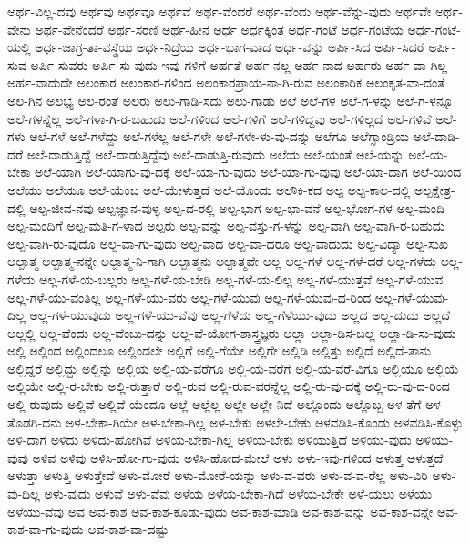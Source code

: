 {ಅರ್ಥ-ವಿಲ್ಲ-ದವು
ಅರ್ಥವು
ಅರ್ಥವೂ
ಅರ್ಥವೆ
ಅರ್ಥ-ವೆಂದರೆ
ಅರ್ಥ-ವೆಂದು
ಅರ್ಥ-ವೆನ್ನು-ವುದು
ಅರ್ಥವೇ
ಅರ್ಥ-ವೇನು
ಅರ್ಥ-ವೇನೆಂದರೆ
ಅರ್ಥ-ಸರಣಿ
ಅರ್ಥ-ಹೀನ
ಅರ್ಧ
ಅರ್ಧಕ್ಕಿಂತ
ಅರ್ಧ-ಗಂಟೆ
ಅರ್ಧ-ಗಂಟೆಯ
ಅರ್ಧ-ಗಂಟೆ-ಯಲ್ಲಿ
ಅರ್ಧ-ಜಾಗ್ರ-ತಾ-ವಸ್ಥೆಯ
ಅರ್ಧ-ನಿದ್ರೆಯ
ಅರ್ಧ-ಭಾಗ-ವಾದ
ಅರ್ಧ-ವನ್ನು
ಅರ್ಪಿ-ಸಿದ
ಅರ್ಪಿ-ಸಿದರೆ
ಅರ್ಪಿ-ಸುವ
ಅರ್ಪಿ-ಸುವರು
ಅರ್ಪಿ-ಸು-ವುದು-ಇವು-ಗಳಿಗೆ
ಅರ್ಹತೆ
ಅರ್ಹ-ನಲ್ಲ
ಅರ್ಹ-ನಾದ
ಅರ್ಹರು
ಅರ್ಹ-ವಾ-ಗಿಲ್ಲ
ಅರ್ಹ-ವಾದುದೇ
ಅಲಂಕಾರ
ಅಲಂಕಾರ-ಗಳಿಂದ
ಅಲಂಕಾರಪ್ರಾಯ-ನಾ-ಗಿ-ರುವ
ಅಲಂಕಾರಿಕ
ಅಲಂಕೃತ-ವಾ-ದಂತೆ
ಅಲ-ಗಿನ
ಅಲಭ್ಯ
ಅಲ-ರಂತೆ
ಅಲರು
ಅಲು-ಗಾಡಿ-ಸದು
ಅಲು-ಗಾಡು
ಅಲೆ
ಅಲೆ-ಗಳ
ಅಲೆ-ಗ-ಳನ್ನು
ಅಲೆ-ಗ-ಳನ್ನೂ
ಅಲೆ-ಗಳನ್ನೆಲ್ಲ
ಅಲೆ-ಗಳಾ-ಗಿ-ರ-ಬಹುದು
ಅಲೆ-ಗಳಿಂದ
ಅಲೆ-ಗಳಿಗೆ
ಅಲೆ-ಗಳಿದ್ದವು
ಅಲೆ-ಗಳಿಲ್ಲದೆ
ಅಲೆ-ಗಳಿವೆ
ಅಲೆ-ಗಳು
ಅಲೆ-ಗಳೆ
ಅಲೆ-ಗಳೆದ್ದು
ಅಲೆ-ಗಳೆಲ್ಲ
ಅಲೆ-ಗಳೇ
ಅಲೆ-ಗಳೇ-ಳು-ವು-ದನ್ನು
ಅಲೆಗೂ
ಅಲೆಗ್ಸಾಂಡ್ರಿಯ
ಅಲೆ-ದಾಡಿ-ದರೆ
ಅಲೆ-ದಾಡುತ್ತಿದ್ದೆ
ಅಲೆ-ದಾಡುತ್ತಿದ್ದೆವು
ಅಲೆ-ದಾಡುತ್ತಿ-ರುವುದು
ಅಲೆಯ
ಅಲೆ-ಯಂತೆ
ಅಲೆ-ಯನ್ನು
ಅಲೆ-ಯ-ಬೇಕಾ
ಅಲೆ-ಯಾಗಿ
ಅಲೆ-ಯಾಗು-ವು-ದಕ್ಕೆ
ಅಲೆ-ಯಾ-ಗು-ವುದು
ಅಲೆ-ಯಾ-ಗು-ವುವು
ಅಲೆ-ಯಾ-ದಾಗ
ಅಲೆ-ಯಿಂದ
ಅಲೆಯು
ಅಲೆಯೂ
ಅಲೆ-ಯೆಂಬ
ಅಲೆ-ಯೇಳುತ್ತದೆ
ಅಲೆ-ಯೊಂದು
ಅಲೌಕಿ-ಕದ
ಅಲ್ಪ
ಅಲ್ಪ-ಕಾಲ-ದಲ್ಲಿ
ಅಲ್ಪಕ್ಷೇತ್ರ-ದಲ್ಲಿ
ಅಲ್ಪ-ಜೀವ-ನವು
ಅಲ್ಪಜ್ಞಾನ-ವುಳ್ಳ
ಅಲ್ಪ-ದ-ರಲ್ಲಿ
ಅಲ್ಪ-ಭಾಗ
ಅಲ್ಪ-ಭಾ-ವನೆ
ಅಲ್ಪ-ಭೋಗ-ಗಳ
ಅಲ್ಪ-ಮಂದಿ
ಅಲ್ಪ-ಮಂದಿಗೆ
ಅಲ್ಪ-ಮತಿ-ಗ-ಳಾದ
ಅಲ್ಪರು
ಅಲ್ಪ-ವನ್ನು
ಅಲ್ಪ-ವಸ್ತು-ಗ-ಳನ್ನು
ಅಲ್ಪ-ವಾಗಿ
ಅಲ್ಪ-ವಾಗಿ-ರ-ಬಹುದು
ಅಲ್ಪ-ವಾಗಿ-ರು-ವುದೊ
ಅಲ್ಪ-ವಾ-ಗು-ವುದು
ಅಲ್ಪ-ವಾದ
ಅಲ್ಪ-ವಾ-ದರೂ
ಅಲ್ಪ-ವಾದುದು
ಅಲ್ಪ-ವಿದ್ಯಾ
ಅಲ್ಪ-ಸುಖ
ಅಲ್ಪಾತ್ಮ
ಅಲ್ಪಾತ್ಮ-ನನ್ನೇ
ಅಲ್ಪಾತ್ಮ-ನಿ-ಗಾಗಿ
ಅಲ್ಪಾತ್ಮನು
ಅಲ್ಪಾತ್ಮವೇ
ಅಲ್ಲ
ಅಲ್ಲ-ಗಳೆ
ಅಲ್ಲ-ಗಳೆ-ದರೆ
ಅಲ್ಲ-ಗಳೆದು
ಅಲ್ಲ-ಗಳೆಯ
ಅಲ್ಲ-ಗಳೆ-ಯ-ಬಲ್ಲರು
ಅಲ್ಲ-ಗಳೆ-ಯ-ಬೇಡಿ
ಅಲ್ಲ-ಗಳೆ-ಯ-ಲಿಲ್ಲ
ಅಲ್ಲ-ಗಳೆ-ಯುತ್ತವೆ
ಅಲ್ಲ-ಗಳೆ-ಯುವ
ಅಲ್ಲ-ಗಳೆ-ಯು-ವಂತಿಲ್ಲ
ಅಲ್ಲ-ಗಳೆ-ಯು-ವರು
ಅಲ್ಲ-ಗಳೆ-ಯುವು
ಅಲ್ಲ-ಗಳೆ-ಯುವು-ದ-ರಿಂದ
ಅಲ್ಲ-ಗಳೆ-ಯುವು-ದಿಲ್ಲ
ಅಲ್ಲ-ಗಳೆ-ಯುವುದು
ಅಲ್ಲ-ಗಳೆ-ಯು-ವೆವು
ಅಲ್ಲ-ಗೆಳೆದು
ಅಲ್ಲ-ಗೆಳೆಯು-ವುದು
ಅಲ್ಲದ
ಅಲ್ಲ-ದುದು
ಅಲ್ಲದೆ
ಅಲ್ಲಲ್ಲಿ
ಅಲ್ಲ-ವೆಂದು
ಅಲ್ಲ-ವೆಂಬು-ದನ್ನು
ಅಲ್ಲ-ವೆ-ಯೋಗ-ಶಾಸ್ತ್ರಜ್ಞರು
ಅಲ್ಲಾ
ಅಲ್ಲಾ-ಡಿಸ-ಬಲ್ಲ
ಅಲ್ಲಾ-ಡಿ-ಸು-ವುದು
ಅಲ್ಲಿ
ಅಲ್ಲಿಂದ
ಅಲ್ಲಿಂದಲೂ
ಅಲ್ಲಿಂದಲೇ
ಅಲ್ಲಿಗೆ
ಅಲ್ಲಿ-ಗೆಯೇ
ಅಲ್ಲಿಗೇ
ಅಲ್ಲಿಡಿ
ಅಲ್ಲಿತ್ತು
ಅಲ್ಲಿದೆ
ಅಲ್ಲಿದೆ-ತಾನು
ಅಲ್ಲಿದ್ದರೆ
ಅಲ್ಲಿದ್ದು
ಅಲ್ಲಿನ್ನು
ಅಲ್ಲಿಯ
ಅಲ್ಲಿ-ಯ-ವರೆಗೂ
ಅಲ್ಲಿ-ಯ-ವರೆಗೆ
ಅಲ್ಲಿ-ಯ-ವರೆ-ವಿಗೂ
ಅಲ್ಲಿಯೂ
ಅಲ್ಲಿಯೆ
ಅಲ್ಲಿಯೇ
ಅಲ್ಲಿ-ರ-ಬೇಕು
ಅಲ್ಲಿ-ರುತ್ತಾರೆ
ಅಲ್ಲಿ-ರುವ
ಅಲ್ಲಿ-ರುವ-ವರನ್ನೆಲ್ಲ
ಅಲ್ಲಿ-ರು-ವು-ದಕ್ಕೆ
ಅಲ್ಲಿ-ರು-ವು-ದ-ರಿಂದ
ಅಲ್ಲಿ-ರುವುದು
ಅಲ್ಲಿವೆ
ಅಲ್ಲಿವೆ-ಯೆಂದೂ
ಅಲ್ಲೆ
ಅಲ್ಲೆಲ್ಲ
ಅಲ್ಲೇ
ಅಲ್ಲೇ-ನಿದೆ
ಅಲ್ಲೊಂದು
ಅಲ್ಲೊಬ್ಬ
ಅಳ-ತೆಗೆ
ಅಳ-ತೊಡಗಿ-ದನು
ಅಳ-ಬೇಕಾ-ಗಿಯೇ
ಅಳ-ಬೇಕಾ-ಗಿಲ್ಲ
ಅಳ-ಬೇಕು
ಅಳಲೇ-ಬೇಕು
ಅಳವಡಿಸಿ-ಕೊಂಡು
ಅಳವಡಿಸಿ-ಕೊಳ್ಳು
ಅಳಿ-ದಾಗ
ಅಳಿದು
ಅಳಿದು-ಹೋಗಿವೆ
ಅಳಿಯ-ಬೇಕಾ-ಗಿಲ್ಲ
ಅಳಿಯ-ಬೇಕು
ಅಳಿಯುತ್ತಿದೆ
ಅಳಿಯು-ವುದು
ಅಳಿಯು-ವುವು
ಅಳಿವ
ಅಳಿವು
ಅಳಿಸಿ-ಹೋ-ಗು-ವುದು
ಅಳಿಸಿ-ಹೋದ-ಮೇಲೆ
ಅಳು
ಅಳು-ಇವು-ಗಳಿಂದ
ಅಳುತ್ತ
ಅಳುತ್ತದೆ
ಅಳುತ್ತಾ
ಅಳುತ್ತಿ
ಅಳುತ್ತೇವೆ
ಅಳು-ಮೋರೆ
ಅಳು-ಮೋರೆ-ಯನ್ನು
ಅಳು-ವ-ವರು
ಅಳು-ವ-ವ-ರೆಲ್ಲ
ಅಳು-ವಿರಿ
ಅಳು-ವು-ದಿಲ್ಲ
ಅಳು-ವುದು
ಅಳುವೆ
ಅಳು-ವೆವು
ಅಳೆಯ
ಅಳೆಯ-ಬೇಕಾ-ಗಿದೆ
ಅಳೆಯ-ಬೇಕೇ
ಅಳೆ-ಯಲು
ಅಳೆಯು
ಅಳೆಯು-ವೆವು
ಅವ
ಅವ-ಕಾಶ
ಅವ-ಕಾಶ-ಕೊಡು-ವುದು
ಅವ-ಕಾಶ-ಮಾಡಿ
ಅವ-ಕಾಶ-ವನ್ನು
ಅವ-ಕಾಶ-ವನ್ನೇ
ಅವ-ಕಾಶ-ವಾ-ಗು-ವುದು
ಅವ-ಕಾಶ-ವಾ-ದಷ್ಟು
}
